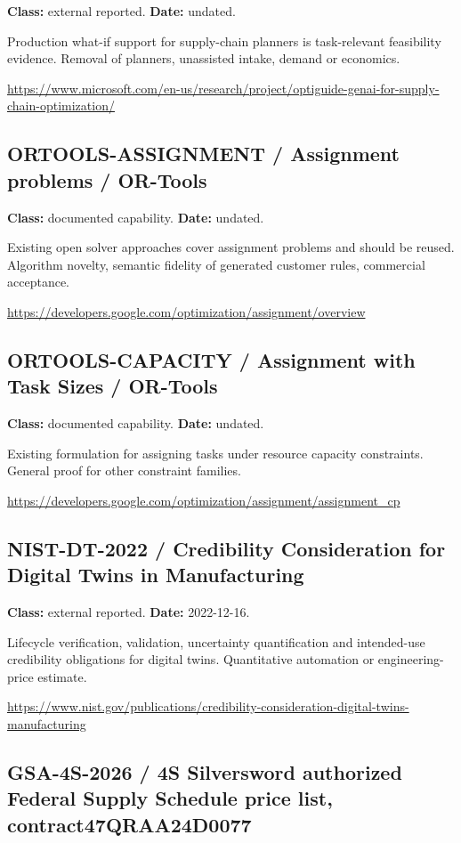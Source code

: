 \documentclass[10pt]{article}
\begin{document}
\textbf{Class:} external reported. \textbf{Date:} undated.

Production what-if support for supply-chain planners is task-relevant feasibility evidence. Removal of planners, unassisted intake, demand or economics.

\url{https://www.microsoft.com/en-us/research/project/optiguide-genai-for-supply-chain-optimization/}

\subsection*{ORTOOLS-ASSIGNMENT / Assignment problems / OR-Tools}

\textbf{Class:} documented capability. \textbf{Date:} undated.

Existing open solver approaches cover assignment problems and should be reused. Algorithm novelty, semantic fidelity of generated customer rules, commercial acceptance.

\url{https://developers.google.com/optimization/assignment/overview}

\subsection*{ORTOOLS-CAPACITY / Assignment with Task Sizes / OR-Tools}

\textbf{Class:} documented capability. \textbf{Date:} undated.

Existing formulation for assigning tasks under resource capacity constraints. General proof for other constraint families.

\url{https://developers.google.com/optimization/assignment/assignment_cp}

\subsection*{NIST-DT-2022 / Credibility Consideration for Digital Twins in Manufacturing}

\textbf{Class:} external reported. \textbf{Date:} 2022-12-16.

Lifecycle verification, validation, uncertainty quantification and intended-use credibility obligations for digital twins. Quantitative automation or engineering-price estimate.

\url{https://www.nist.gov/publications/credibility-consideration-digital-twins-manufacturing}

\subsection*{GSA-4S-2026 / 4S Silversword authorized Federal Supply Schedule price list, contract47QRAA24D0077}
\end{document}
